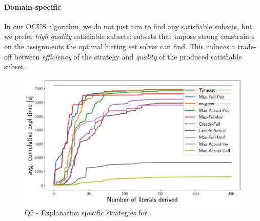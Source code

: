 \paragraph{Domain-specific \grow} 
In our OCUS algorithm, we do not just aim to find any satisfiable subsets, but we prefer \emph{high quality} satisfiable subsets: subsets that impose strong constraints on the assignments the optimal hitting set solver can find. 
This induces a trade-off between \emph{efficiency} of the \grow strategy and \emph{quality} of the produced satisfiable subset.

\begin{figure}[t]
  \centering
  \includegraphics[width=\columnwidth]{figures_post_paper/new_cumul_grow_avg_time_lits_derived.pdf}
  \caption{Q2 - Explanation specific \grow strategies for \comus.}
  \label{fig:grow_strategies}
\end{figure}


